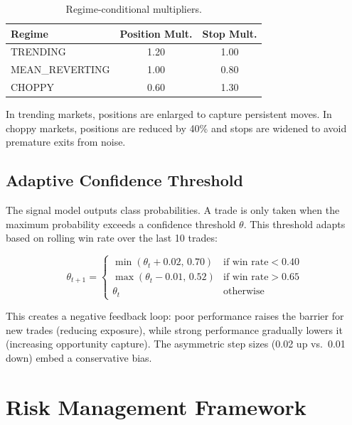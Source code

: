 \documentclass[12pt,a4paper]{article}
\begin{document}
\begin{table}[h!]
\centering
\caption{Regime-conditional multipliers.}
\begin{tabular}{@{}lcc@{}}
\toprule
\textbf{Regime} & \textbf{Position Mult.} & \textbf{Stop Mult.} \\
\midrule
TRENDING & 1.20 & 1.00 \\
MEAN\_REVERTING & 1.00 & 0.80 \\
CHOPPY & 0.60 & 1.30 \\
\bottomrule
\end{tabular}
\end{table}

In trending markets, positions are enlarged to capture persistent moves. In choppy markets, positions are reduced by 40\% and stops are widened to avoid premature exits from noise.

\subsection{Adaptive Confidence Threshold}
\label{sec:regime:threshold}

The signal model outputs class probabilities. A trade is only taken when the maximum probability exceeds a confidence threshold $\theta$. This threshold adapts based on rolling win rate over the last 10 trades:

\begin{equation}
    \theta_{t+1} = \begin{cases}
        \min(\theta_t + 0.02,\, 0.70) & \text{if win rate} < 0.40 \\
        \max(\theta_t - 0.01,\, 0.52) & \text{if win rate} > 0.65 \\
        \theta_t & \text{otherwise}
    \end{cases}
\end{equation}

This creates a negative feedback loop: poor performance raises the barrier for new trades (reducing exposure), while strong performance gradually lowers it (increasing opportunity capture). The asymmetric step sizes (0.02 up vs.\ 0.01 down) embed a conservative bias.

\section{Risk Management Framework}
\label{sec:risk}
\end{document}

